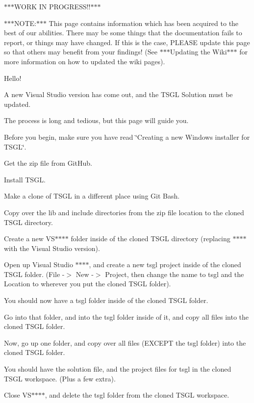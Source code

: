$\ast$$\ast$$\ast$\-W\-O\-R\-K I\-N P\-R\-O\-G\-R\-E\-S\-S!!$\ast$$\ast$$\ast$

$\ast$$\ast$$\ast$\-N\-O\-T\-E\-:$\ast$$\ast$$\ast$ This page contains information which has been acquired to the best of our abilities. There may be some things that the documentation fails to report, or things may have changed. If this is the case, P\-L\-E\-A\-S\-E update this page so that others may benefit from your findings! (See $\ast$$\ast$$\ast$\-Updating the Wiki$\ast$$\ast$$\ast$ for more information on how to updated the wiki pages).

Hello!

A new Visual Studio version has come out, and the T\-S\-G\-L Solution must be updated.

The process is long and tedious, but this page will guide you.

Before you begin, make sure you have read \char`\"{}\-Creating a new Windows installer for T\-S\-G\-L\char`\"{}.

Get the zip file from Git\-Hub.

Install T\-S\-G\-L.

Make a clone of T\-S\-G\-L in a different place using Git Bash.

Copy over the lib and include directories from the zip file location to the cloned T\-S\-G\-L directory.

Create a new V\-S$\ast$$\ast$$\ast$$\ast$ folder inside of the cloned T\-S\-G\-L directory (replacing $\ast$$\ast$$\ast$$\ast$ with the Visual Studio version).

Open up Visual Studio $\ast$$\ast$$\ast$$\ast$, and create a new tsgl project inside of the cloned T\-S\-G\-L folder. (File -\/$>$ New -\/$>$ Project, then change the name to tsgl and the Location to wherever you put the cloned T\-S\-G\-L folder).

You should now have a tsgl folder inside of the cloned T\-S\-G\-L folder.

Go into that folder, and into the tsgl folder inside of it, and copy all files into the cloned T\-S\-G\-L folder.

Now, go up one folder, and copy over all files (E\-X\-C\-E\-P\-T the tsgl folder) into the cloned T\-S\-G\-L folder.

You should have the solution file, and the project files for tsgl in the cloned T\-S\-G\-L workspace. (Plus a few extra).

Close V\-S$\ast$$\ast$$\ast$$\ast$, and delete the tsgl folder from the cloned T\-S\-G\-L workspace.

